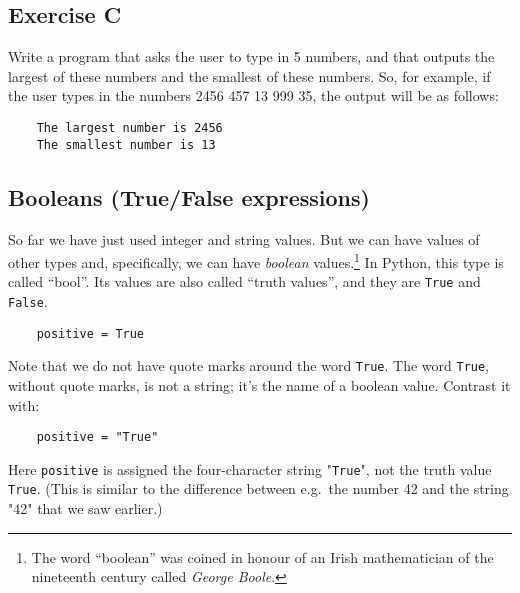 \subsection*{Exercise C}

Write a program that asks the user to type in 5 numbers, and that
outputs the largest of these numbers and the smallest of these
numbers. So, for example, if the user types in the numbers
2456 457  13  999  35, the output will be as follows:

\begin{Verbatim}
    The largest number is 2456
    The smallest number is 13
\end{Verbatim}

\pagebreak

\subsection{Booleans (True/False expressions)}

So far we have just used integer and string values.  But we can
have values of other types and, specifically, we can have
\emph{boolean} values.\footnote{The word ``boolean'' was coined in honour of an
Irish mathematician of the nineteenth century called \emph{George Boole}.}
In Python, this type is called ``bool''. Its values are also called
``truth values'', and they are
\texttt{True} and \texttt{False}.

\begin{Verbatim}
    positive = True
\end{Verbatim}

Note that we do not have quote marks around the word \texttt{True}.  
The word \texttt{True}, without quote marks, is not a string; it's the name of a
boolean value.  Contrast it with:

\begin{Verbatim}
    positive = "True"
\end{Verbatim}

Here \texttt{positive} is assigned
the four-character string "\texttt{True}", not the truth value
\texttt{True}. (This is similar to the difference between e.g.\ the
number 42 and the string "42" that we saw earlier.)

